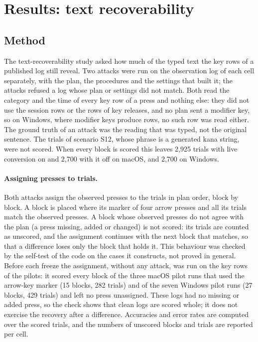 
\section{Results: text recoverability}
\label{sec:recoverability}

\subsection{Method}
\label{sec:recoverability-method}

The text-recoverability study asked how much of the typed text the key rows of a published log still reveal. Two
attacks were run on the observation log of each cell separately, with the plan, the procedures and the settings that
built it; the attacks refused a log whose plan or settings did not match. Both read the category and the time of
every key row of a press and nothing else: they did not use the session rows or the rows of key releases, and no plan
sent a modifier key, so on Windows, where modifier keys produce rows, no such row was read either. The ground truth of
an attack was the reading that was typed,
not the original sentence. The trials of scenario S12, whose phrase is a generated kana string, were not scored. When
every block is scored this leaves 2{,}925 trials with live conversion on and 2{,}700 with it off on macOS, and 2{,}700
on Windows.

\paragraph{Assigning presses to trials.} Both attacks assign the observed presses to the trials in plan order, block
by block. A block is placed where its marker of four arrow presses and all its trials match the observed presses. A
block whose observed presses do not agree with the plan (a press missing, added or changed) is not scored: its trials
are counted as unscored, and the assignment continues with the next block that matches, so that a difference loses
only the block that holds it. This behaviour was checked by the self-test of the code on the cases it constructs, not
proved in general. Before each freeze the assignment, without any attack, was run on the key rows of the pilots: it
scored every block of the three macOS pilot runs that used the arrow-key marker (15 blocks, 282 trials) and of the
seven Windows pilot runs (27 blocks, 429 trials) and left no press unassigned. These logs had no missing or added
press, so the check shows that clean logs are scored whole; it does not exercise the recovery after a difference.
Accuracies and error rates are computed over the scored trials, and the numbers of unscored blocks and trials are
reported per cell.

